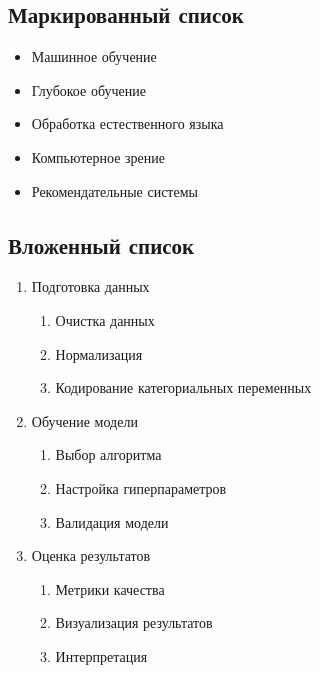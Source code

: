 \subsection{Маркированный список}

\begin{itemize}
\item Машинное обучение
\item Глубокое обучение
\item Обработка естественного языка
\item Компьютерное зрение
\item Рекомендательные системы
\end{itemize}

\subsection{Вложенный список}

\begin{enumerate}
\item Подготовка данных
    \begin{enumerate}
    \item Очистка данных
    \item Нормализация
    \item Кодирование категориальных переменных
    \end{enumerate}
\item Обучение модели
    \begin{enumerate}
    \item Выбор алгоритма
    \item Настройка гиперпараметров
    \item Валидация модели
    \end{enumerate}
\item Оценка результатов
    \begin{enumerate}
    \item Метрики качества
    \item Визуализация результатов
    \item Интерпретация
    \end{enumerate}
\end{enumerate}
